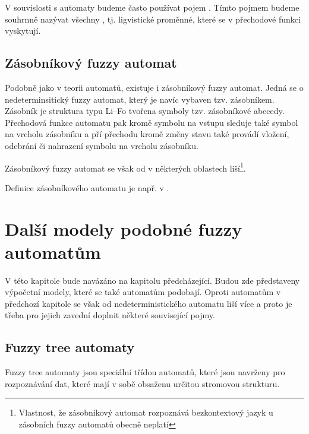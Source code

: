 \documentclass[a4paper,10pt]{article}
\begin{document}
\begin{note}
 V souvislosti s automaty budeme často používat pojem . Tímto pojmem budeme souhrnně nazývat všechny , tj. ligvistické proměnné, které se v přechodové funkci vyskytují.
\end{note}


\subsection{Zásobníkový fuzzy automat}
Podobně jako v  teorii automatů, existuje i zásobníkový fuzzy automat. Jedná se o nedeterminsitický fuzzy automat, který je navíc vybaven tzv. zásobníkem. Zásobník je struktura typu Li--Fo tvořena symboly tzv. zásobníkové abecedy. Přechodová funkce automatu pak kromě symbolu na vstupu sleduje také symbol na vrcholu zásobníku a pří přechodu kromě změny stavu také provádí vložení, odebrání či nahrazení symbolu na vrcholu zásobníku.

Zásobníkový fuzzy automat se však od  v některých oblastech liší\footnote{Vlastnost, že zásobníkový automat rozpoznává bezkontextový jazyk u zásobních fuzzy automatů obecně neplatí}. 

Definice zásobníkového automatu je např. v \cite{BucPas-FuzPusAut}.

\section{Další modely podobné fuzzy automatům}
V této kapitole bude navázáno na kapitolu předcházející. Budou zde představeny výpočetní modely, které se také automatům podobají. Oproti automatům v předchozí kapitole se však od  nedeterministického automatu liší více a proto je třeba pro jejich zavední doplnit některé související pojmy. 


\subsection{Fuzzy tree automaty}
Fuzzy tree automaty jsou speciální třídou automatů, které jsou navrženy pro rozpoznávání dat, které mají v sobě obsaženu určitou stromovou strukturu.
\end{document}
